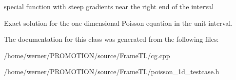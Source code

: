 special function with steep gradients near the right end of the interval

Exact solution for the one-dimensional Poisson equation in the unit interval. 

The documentation for this class was generated from the following files:\begin{CompactItemize}
\item 
/home/werner/PROMOTION/source/FrameTL/cg.cpp\item 
/home/werner/PROMOTION/source/FrameTL/poisson\_\-1d\_\-testcase.h\end{CompactItemize}

